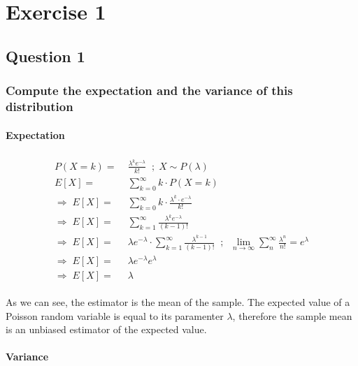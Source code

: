 
\chapter{Exercise 1}

\section{Question 1}

\subsection{Compute the expectation and the variance of this distribution}
\subsubsection{Expectation}

\begin{align}
    \begin{split}
        P(X=k) =& \; \frac{\lambda^k e^{-\lambda}}{k!} \;\; ; \; X \sim P(\lambda) \\
        E[X] =& \; \sum_{k=0}^{\infty} k \cdot P(X=k) \\
        \Rightarrow \; E[X] =& \; \sum_{k=0}^{\infty} k \cdot \frac{\lambda^k \cdot e^{-\lambda}}{k!} \\
        \Rightarrow \; E[X] =& \; \sum_{k=1}^{\infty} \frac{\lambda^{k} e^{-\lambda}}{(k-1)!} \\
        \Rightarrow \; E[X] =& \; \lambda e^{-\lambda} \cdot \sum_{k=1}^{\infty} \frac{\lambda^{k-1}}{(k-1)!} \;\; ; \;\; \lim_{n \to \infty} \sum_{n}^{\infty} \frac{\lambda^n}{n!} = e^{\lambda} \\
        \Rightarrow \; E[X] =& \; \lambda e^{-\lambda} e^{\lambda} \\
        \Rightarrow \; E[X] =& \; \lambda
    \end{split}
\end{align}

As we can see, the estimator is the mean of the sample. The expected value of a Poisson random variable is equal to its paramenter $\lambda$, therefore the sample mean is an unbiased estimator of the expected value.

\subsubsection{Variance}


